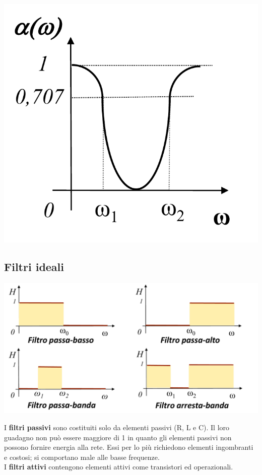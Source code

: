\documentclass{article}
\begin{document}
\begin{center}
    \includegraphics[scale=0.27]{Image/Arresta-banda_2.png}
\end{center}


\subsection{Filtri ideali}
\begin{center}
    \includegraphics[scale=0.3]{Image/Filtri_ideali.png}
\end{center}
I \textbf{filtri passivi} sono costituiti solo da elementi passivi (R, L e C). Il loro guadagno non può essere maggiore di 1 in quanto gli elementi passivi non
possono fornire energia alla rete. Essi per lo più richiedono elementi ingombranti e costosi; si comportano male alle basse frequenze.\\
I \textbf{filtri attivi} contengono elementi attivi come transistori ed operazionali.
\end{document}
